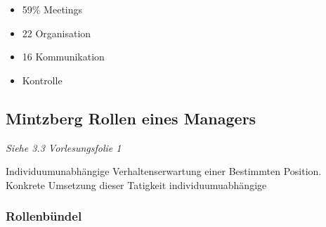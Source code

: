 \begin{itemize}
    \item 59\% Meetings
    \item 22 Organisation
    \item 16 Kommunikation
    \item Kontrolle
\end{itemize}

\subsection{Mintzberg Rollen eines Managers}
\textit{Siehe 3.3 Vorlesungsfolie 1}

\begin{definition}
[Rolle] Individuumunabhängige Verhaltenserwartung einer Bestimmten Position. Konkrete Umsetzung dieser Tatigkeit individuumuabhängige
\end{definition}    

\subsubsection{Rollenbündel}

